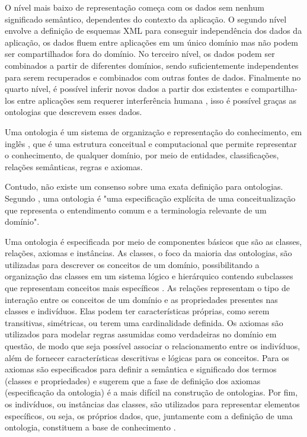 O nível mais baixo de representação começa com os dados sem nenhum significado semântico, dependentes do contexto da aplicação. O segundo nível envolve a definição de esquemas XML para conseguir independência dos dados da aplicação, os dados fluem entre aplicações em um único domínio mas não podem ser compartilhados fora do domínio. No terceiro nível, os dados podem ser combinados a partir de diferentes domínios, sendo suficientemente independentes para serem recuperados e combinados com outras fontes de dados. Finalmente no quarto nível, é possível inferir novos dados a partir dos existentes e compartilha-los entre aplicações sem requerer interferência humana \cite{SugumaranGulla2011}, isso é possível graças as ontologias que descrevem esses dados. 

Uma ontologia é um sistema de organização e representação do conhecimento, em inglês , que é uma estrutura conceitual e computacional que permite representar o conhecimento, de qualquer domínio, por meio de entidades, classificações, relações semânticas, regras e axiomas.

Contudo, não existe um consenso sobre uma exata definição para ontologias. Segundo \cite{Gruber1995}, uma ontologia é "uma especificação explícita de uma conceitualização que representa o entendimento comum e a terminologia relevante de um domínio".

Uma ontologia é especificada por meio de componentes básicos que são as classes, relações, axiomas e instâncias. As classes, o foco da maioria das ontologias, são utilizadas para descrever os conceitos de um domínio, possibilitando a organização das classes em um sistema lógico e hierárquico contendo subclasses que representam conceitos mais específicos \cite{Noy2001}. As relações representam o tipo de interação entre os conceitos de um domínio e as propriedades presentes nas classes e indivíduos. Elas podem ter características próprias, como serem transitivas, simétricas, ou terem uma cardinalidade definida. Os axiomas são utilizados para modelar regras assumidas como verdadeiras no domínio em questão, de modo que seja possível associar o relacionamento entre os indivíduos, além de fornecer características descritivas e lógicas para os conceitos. Para \cite{UscholdGruninger1996} os axiomas são especificados para definir a semântica e significado dos termos (classes e propriedades) e sugerem que a fase de definição dos axiomas (especificação da ontologia) é a mais difícil na construção de ontologias. Por fim, os indivíduos, ou instâncias das classes, são utilizados para representar elementos específicos, ou seja, os próprios dados, que, juntamente com a definição de uma ontologia, constituem a base de conhecimento \cite{Noy2001}.


